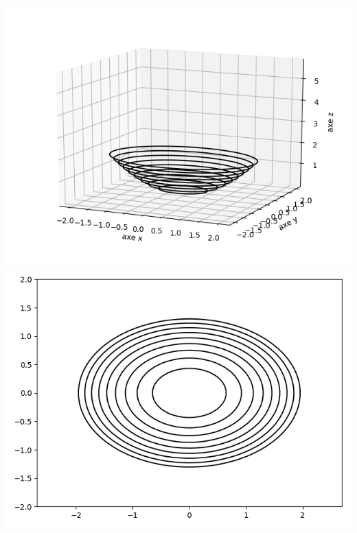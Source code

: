 \begin{exemple}{}{}
\begin{center}
		\includegraphics[scale=\myscale,scale=0.5]{figures/fonctions-quadra-1d}
		\includegraphics[scale=\myscale,scale=0.5]{figures/fonctions-quadra-1e}
	\end{center}
	
	
\end{exemple}


